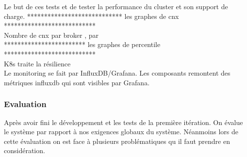     Le but de ces tests et de tester la performance du cluster et son support de charge.
    **************************** les graphes de cnx *************************** \\

    Nombre de cnx par broker , par \\

    ************************ les graphes de percentile ***************************\\
    K8s traite la résilience \\

    Le monitoring se fait par InfluxDB/Grafana. Les composants remontent des métriques influxdb qui sont visibles par Grafana. 
        
    \subsubsection{Evaluation}

    Après avoir fini le développement et les tests de la première itération. 
    On évalue le système par rapport à nos exigences globaux du système. 
    Néanmoins lors de cette évaluation on est face à plusieurs problématiques qu il faut prendre en considération. 

